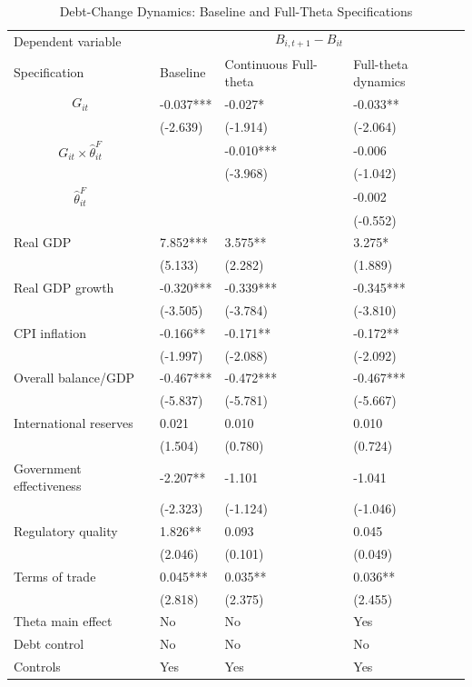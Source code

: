 \begin{table}[H]\centering
\begin{threeparttable}
\caption{Debt-Change Dynamics: Baseline and Full-Theta Specifications}
\label{tab:debt_change_combined_fulltheta}
\scriptsize
\begin{tabularx}{\textwidth}{lYYY}
\toprule
Dependent variable &  \\
\cmidrule(lr){2-4}
Specification & Baseline & Continuous Full-theta & Full-theta dynamics \\
\midrule
$$G_{it}$$ & -0.037*** & -0.027* & -0.033** \\
 & (-2.639) & (-1.914) & (-2.064) \\
$$G_{it}\times\widehat{\theta}^{F}_{it}$$ &  & -0.010*** & -0.006 \\
 &  & (-3.968) & (-1.042) \\
$$\widehat{\theta}^{F}_{it}$$ &  &  & -0.002 \\
 &  &  & (-0.552) \\
Real GDP & 7.852*** & 3.575** & 3.275* \\
 & (5.133) & (2.282) & (1.889) \\
Real GDP growth & -0.320*** & -0.339*** & -0.345*** \\
 & (-3.505) & (-3.784) & (-3.810) \\
CPI inflation & -0.166** & -0.171** & -0.172** \\
 & (-1.997) & (-2.088) & (-2.092) \\
Overall balance/GDP & -0.467*** & -0.472*** & -0.467*** \\
 & (-5.837) & (-5.781) & (-5.667) \\
International reserves & 0.021 & 0.010 & 0.010 \\
 & (1.504) & (0.780) & (0.724) \\
Government effectiveness & -2.207** & -1.101 & -1.041 \\
 & (-2.323) & (-1.124) & (-1.046) \\
Regulatory quality & 1.826** & 0.093 & 0.045 \\
 & (2.046) & (0.101) & (0.049) \\
Terms of trade & 0.045*** & 0.035** & 0.036** \\
 & (2.818) & (2.375) & (2.455) \\
\midrule
Theta main effect & No & No & Yes \\
Debt control & No & No & No \\
Controls & Yes & Yes & Yes \\

\end{tabularx}
\end{threeparttable}
\end{table}
